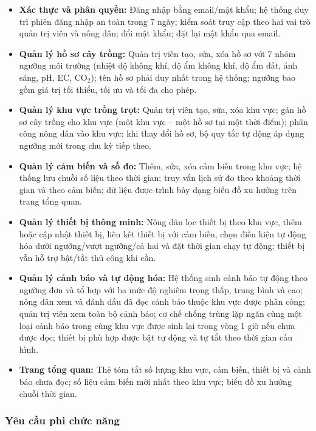 \documentclass[13pt,a4paper]{extarticle}
\numberwithin{figure}{section}
\numberwithin{table}{section}
\begin{document}
	\begin{itemize}[leftmargin=1.5cm,label=-]
		\item \textbf{Xác thực và phân quyền:} Đăng nhập bằng email/mật khẩu; hệ thống duy trì phiên đăng nhập an toàn trong 7 ngày; kiểm soát truy cập theo hai vai trò quản trị viên và nông dân; đổi mật khẩu; đặt lại mật khẩu qua email.
		\item \textbf{Quản lý hồ sơ cây trồng:} Quản trị viên tạo, sửa, xóa hồ sơ với 7 nhóm ngưỡng môi trường (nhiệt độ không khí, độ ẩm không khí, độ ẩm đất, ánh sáng, pH, EC, CO$_2$); tên hồ sơ phải duy nhất trong hệ thống; ngưỡng bao gồm giá trị tối thiểu, tối ưu và tối đa cho phép.
		\item \textbf{Quản lý khu vực trồng trọt:} Quản trị viên tạo, sửa, xóa khu vực; gán hồ sơ cây trồng cho khu vực (một khu vực -- một hồ sơ tại một thời điểm); phân công nông dân vào khu vực; khi thay đổi hồ sơ, bộ quy tắc tự động áp dụng ngưỡng mới trong chu kỳ tiếp theo.
		\item \textbf{Quản lý cảm biến và số đo:} Thêm, sửa, xóa cảm biến trong khu vực; hệ thống lưu chuỗi số liệu theo thời gian; truy vấn lịch sử đo theo khoảng thời gian và theo cảm biến; dữ liệu được trình bày dạng biểu đồ xu hướng trên trang tổng quan.
		\item \textbf{Quản lý thiết bị thông minh:} Nông dân lọc thiết bị theo khu vực, thêm hoặc cập nhật thiết bị, liên kết thiết bị với cảm biến, chọn điều kiện tự động hóa dưới ngưỡng/vượt ngưỡng/cả hai và đặt thời gian chạy tự động; thiết bị vẫn hỗ trợ bật/tắt thủ công khi cần.
		\item \textbf{Quản lý cảnh báo và tự động hóa:} Hệ thống sinh cảnh báo tự động theo ngưỡng đơn và tổ hợp với ba mức độ nghiêm trọng thấp, trung bình và cao; nông dân xem và đánh dấu đã đọc cảnh báo thuộc khu vực được phân công; quản trị viên xem toàn bộ cảnh báo; cơ chế chống trùng lặp ngăn cùng một loại cảnh báo trong cùng khu vực được sinh lại trong vòng 1 giờ nếu chưa được đọc; thiết bị phù hợp được bật tự động và tự tắt theo thời gian cấu hình.
		\item \textbf{Trang tổng quan:} Thẻ tóm tắt số lượng khu vực, cảm biến, thiết bị và cảnh báo chưa đọc; số liệu cảm biến mới nhất theo khu vực; biểu đồ xu hướng chuỗi thời gian.
	\end{itemize}
	
	\subsubsection{Yêu cầu phi chức năng}
	
\end{document}
